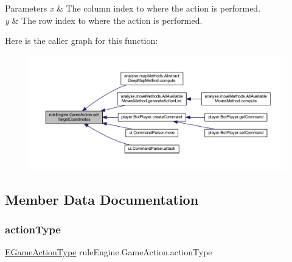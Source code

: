 \begin{DoxyParams}{Parameters}
{\em x} & The column index to where the action is performed. \\
\hline
{\em y} & The row index to where the action is performed. \\
\hline
\end{DoxyParams}
Here is the caller graph for this function\+:
\nopagebreak
\begin{figure}[H]
\begin{center}
\leavevmode
\includegraphics[width=350pt]{classrule_engine_1_1_game_action_ace03895cc8a7061ecd2af09156cead26_icgraph}
\end{center}
\end{figure}


\subsection{Member Data Documentation}
\mbox{\label{classrule_engine_1_1_game_action_a385c48464866d2cd11bdf90323e52df8}} 
\subsubsection{\texorpdfstring{action\+Type}{actionType}}
{\footnotesize\ttfamily \mbox{\hyperlink{enumrule_engine_1_1_e_game_action_type}{E\+Game\+Action\+Type}} rule\+Engine.\+Game\+Action.\+action\+Type\hspace{0.3cm}{\ttfamily [private]}}

\mbox{\label{classrule_engine_1_1_game_action_a966cfb64533d4cbe0ca5233ed642719d}} 
